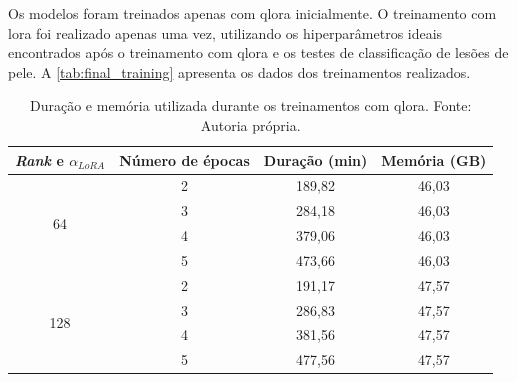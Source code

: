 Os modelos foram treinados apenas com \ac{qlora} inicialmente. O treinamento com \ac{lora} foi realizado apenas uma
vez, utilizando os hiperparâmetros ideais encontrados após o treinamento com \ac{qlora} e os testes de classificação de
lesões de pele. A \autoref{tab:final_training} apresenta os dados dos treinamentos realizados.

\begin{table}[ht]
    \centering
    \begin{tabular}{c|c|c|c}
        \hline
        \textit{Rank} e \begin{math}\alpha_{LoRA}\end{math} & Número de épocas & Duração (min)
                                                            & Memória (GB)
        \\ \hline
        \multirow{4}{*}{64}                                 & 2                & 189,82        &
        46,03                                                                                    \\
                                                            & 3                & 284,18        &
        46,03                                                                                    \\
                                                            & 4                & 379,06        &
        46,03                                                                                    \\
                                                            & 5                & 473,66        &
        46,03                                                                                    \\ \hline
        \multirow{4}{*}{128}                                & 2                & 191,17        &
        47,57                                                                                    \\
                                                            & 3                & 286,83        &
        47,57                                                                                    \\
                                                            & 4                & 381,56        &
        47,57                                                                                    \\
                                                            & 5                & 477,56        &
        47,57                                                                                    \\ \hline
    \end{tabular}
    \label{tab:final_training}
    \caption{Duração e memória utilizada durante os treinamentos com \ac{qlora}. Fonte: Autoria própria.}
\end{table}

